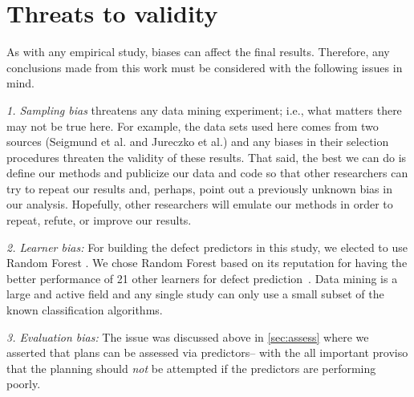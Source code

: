 \documentclass[conference]{IEEEtran}
\newcommand{\tion}[1]{\textsection\ref{sec:#1}}
\begin{document}
\section{Threats to validity}

 

As with any empirical study, biases can affect the final results. Therefore, any
conclusions made from this work must be considered with the following issues in
mind.

{\em 1. Sampling bias} threatens any data mining experiment; i.e., what matters
there may not be true here. For example, the data sets used here comes from two sources
(Seigmund et al. and Jureczko et al.) and any biases in their selection procedures
threaten the validity of these results. 
That said,
the best we can do is define our methods and publicize our data and code so that other researchers can
try to repeat our results and, perhaps, point out a previously unknown bias
in our analysis. Hopefully, other researchers will emulate our methods in
order to repeat, refute, or improve our results. 

{\em 2. Learner bias: } For building the defect predictors in this study, we elected
to use  Random Forest  .
We chose Random Forest based on its reputation for having the better  performance of 
21 other learners for defect prediction~\cite{lessmann}.
Data mining is a
large and active field and any single study can only use a small
subset of the known classification algorithms.  

{\em 3. Evaluation bias:} The issue was discussed above in \tion{assess} where
we asserted that plans can be assessed via predictors-- with the all important
proviso that the planning should {\em not} be attempted if the predictors
are performing poorly.

 
\end{document}
